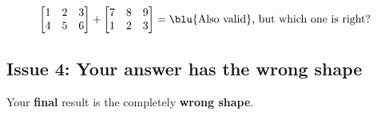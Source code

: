         \begin{equation*}
                \begin{bmatrix}
                  1&2&3\\4&5&6
                \end{bmatrix}
                +
                \begin{bmatrix}
                  7&8&9\\1&2&3
                \end{bmatrix}
                = \text{\blu{Also valid}, but which one is right? }
            \end{equation*}
        
    \subsection*{Issue 4: Your answer has the wrong shape}
        
        Your \textbf{final} result is the completely \textbf{wrong shape}.
        
